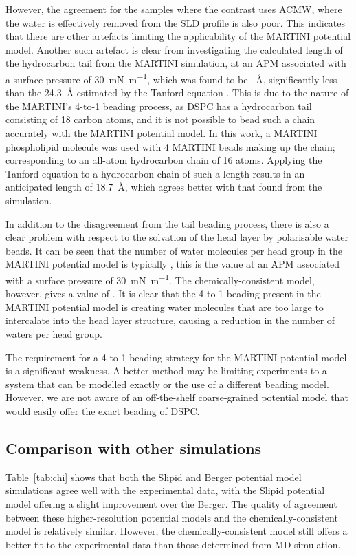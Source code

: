 However, the agreement for the samples where the contrast uses ACMW, where the water is effectively removed from the SLD profile is also poor.
This indicates that there are other artefacts limiting the applicability of the MARTINI potential model.
Another such artefact is clear from investigating the calculated length of the hydrocarbon tail from the MARTINI simulation, at an APM associated with a surface pressure of \SI{30}{\milli\newton\per\meter}, which was found to be ~\si{\angstrom}, significantly less than the \SI{24.3}{\angstrom} estimated by the Tanford equation \cite{tanford_hydrophobic_1980}.
This is due to the nature of the MARTINI's 4-to-1 beading process, as DSPC has a hydrocarbon tail consisting of 18 carbon atoms, and it is not possible to bead such a chain accurately with the MARTINI potential model.
In this work, a MARTINI phospholipid molecule was used with 4 MARTINI beads making up the chain; corresponding to an all-atom hydrocarbon chain of 16 atoms.
Applying the Tanford equation to a hydrocarbon chain of such a length results in an anticipated length of \SI{18.7}{\angstrom}, which agrees better with that found from the simulation.

In addition to the disagreement from the tail beading process, there is also a clear problem with respect to the solvation of the head layer by polarisable water beads.
It can be seen that the number of water molecules per head group in the MARTINI potential model is typically , this is the value at an APM associated with a surface pressure of \SI{30}{\milli\newton\per\meter}.
The chemically-consistent model, however, gives a value of .
It is clear that the 4-to-1 beading present in the MARTINI potential model is creating water molecules that are too large to intercalate into the head layer structure, causing a reduction in the number of waters per head group.

The requirement for a 4-to-1 beading strategy for the MARTINI potential model is a significant weakness.
A better method may be limiting experiments to a system that can be modelled exactly or the use of a different beading model.
However, we are not aware of an off-the-shelf coarse-grained potential model that would easily offer the exact beading of DSPC.

\subsection{Comparison with other simulations}
Table~\ref{tab:chi} shows that both the Slipid and Berger potential model simulations agree well with the experimental data, with the Slipid potential model offering a slight improvement over the Berger.
The quality of agreement between these higher-resolution potential models and the chemically-consistent model is relatively similar.
However, the chemically-consistent model still offers a better fit to the experimental data than those determined from MD simulation.

